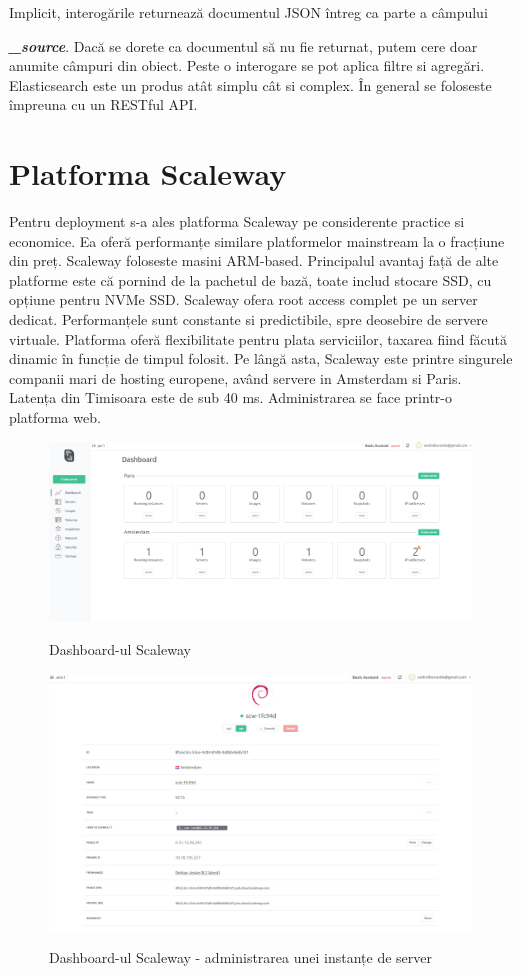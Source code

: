 \documentclass[a4paper, 12pt, twoside]{report}
\begin{document}
Implicit, interogările returnează documentul JSON întreg ca parte a câmpului {\textbf{\textit{\_source}}. Dacă se dorete ca documentul să nu fie returnat, putem cere doar anumite câmpuri din obiect. Peste o interogare se pot aplica filtre si agregări. Elasticsearch este un produs atât simplu cât si complex. În general se foloseste împreuna cu un RESTful API.

	\section{Platforma Scaleway}
Pentru deployment s-a ales platforma Scaleway pe considerente practice si economice. Ea oferă performanțe similare platformelor mainstream la o fracțiune din preț. Scaleway foloseste masini ARM-based. Principalul avantaj față de alte platforme este că pornind de la pachetul de bază, toate includ stocare SSD, cu opțiune pentru NVMe SSD. Scaleway ofera root access complet pe un server dedicat. Performanțele sunt constante si predictibile, spre deosebire de servere virtuale. Platforma oferă flexibilitate pentru plata serviciilor, taxarea fiind făcută dinamic în funcție de timpul folosit. Pe lângă asta, Scaleway este printre singurele companii mari de hosting europene, având servere in Amsterdam si Paris. Latența din Timisoara este de sub 40 ms. Administrarea se face printr-o platforma web.
\bigskip
\bigskip
\begin{figure}[h]
	\centering
		{\includegraphics[width=170mm]{scaleway1.png}}
	\caption{Dashboard-ul Scaleway}
\end{figure}
\begin{figure}[h]
	\centering
		{\includegraphics[width=170mm]{scaleway2.png}}
	\caption{Dashboard-ul Scaleway - administrarea unei instanțe de server}
\end{figure}


}
\end{document}
